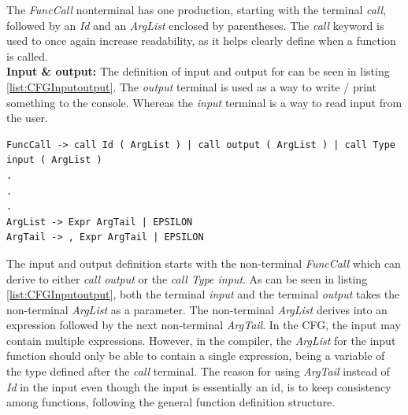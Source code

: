 The \textit{FuncCall} nonterminal has one production, starting with the terminal \textit{call}, followed by an \textit{Id} and an \textit{ArgList} enclosed by parentheses. The \textit{call} keyword is used to once again increase readability, as it helps clearly define when a function is called. \\

\textbf{Input \& output: } The definition of input and output for \lang can be seen in listing \ref{list:CFGInputoutput}. The \textit{output} terminal is used as a way to write / print something to the console. Whereas the \textit{input} terminal is a way to read input from the user. 
\begin{lstlisting}[language=scriptkid, label={list:CFGInputoutput},caption=Input \& output of \lang CFG]
FuncCall -> call Id ( ArgList ) | call output ( ArgList ) | call Type input ( ArgList )
.
.
.
ArgList -> Expr ArgTail | EPSILON   
ArgTail -> , Expr ArgTail | EPSILON 
\end{lstlisting}
The input and output definition starts with the non-terminal \textit{FuncCall} which can derive to either \textit{call output} or the \textit{call Type input}. As can be seen in listing \ref{list:CFGInputoutput}, both the terminal \textit{input} and the terminal \textit{output} takes the non-terminal \textit{ArgList} as a parameter. The non-terminal \textit{ArgList} derives into an expression followed by the next non-terminal \textit{ArgTail}. In the CFG, the input may contain multiple expressions. However, in the compiler, the \textit{ArgList} for the input function should only be able to contain a single expression, being a variable of the type defined after the \textit{call} terminal. The reason for using \textit{ArgTail} instead of \textit{Id} in the input even though the input is essentially an id, is to keep consistency among functions, following the general function definition structure. 
\\


